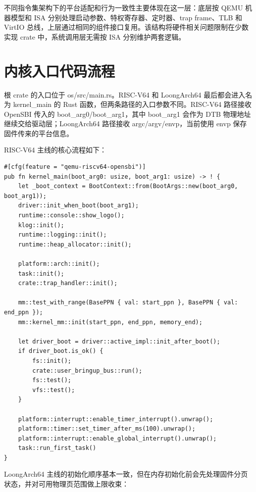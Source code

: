\documentclass[12pt,openany,oneside,AutoFakeBold=true]{ctexbook}
\newcommand{\code}[1]{\textnormal{\rmfamily #1}}
\begin{document}
不同指令集架构下的平台适配和行为一致性主要体现在这一层：底层按 QEMU 机器模型和 ISA 分别处理启动参数、特权寄存器、定时器、trap frame、TLB 和 VirtIO 总线，上层通过相同的组件接口复用。该结构将硬件相关问题限制在少数实现 crate 中，系统调用层无需按 ISA 分别维护两套逻辑。


\section{内核入口代码流程}

根 crate 的入口位于 \code{os/src/main.rs}。RISC-V64 和 LoongArch64 最后都会进入名为 \code{kernel\_main} 的 Rust 函数，但两条路径的入口参数不同。RISC-V64 路径接收 OpenSBI 传入的 \code{boot\_arg0/boot\_arg1}，其中 \code{boot\_arg1} 会作为 DTB 物理地址继续交给驱动层；LoongArch64 路径接收 \code{argc/argv/envp}，当前使用 \code{envp} 保存固件传来的平台信息。

RISC-V64 主线的核心流程如下：

\begin{lstlisting}
#[cfg(feature = "qemu-riscv64-opensbi")]
pub fn kernel_main(boot_arg0: usize, boot_arg1: usize) -> ! {
    let _boot_context = BootContext::from(BootArgs::new(boot_arg0, boot_arg1));
    driver::init_when_boot(boot_arg1);
    runtime::console::show_logo();
    klog::init();
    runtime::logging::init();
    runtime::heap_allocator::init();

    platform::arch::init();
    task::init();
    crate::trap_handler::init();

    mm::test_with_range(BasePPN { val: start_ppn }, BasePPN { val: end_ppn });
    mm::kernel_mm::init(start_ppn, end_ppn, memory_end);

    let driver_boot = driver::active_impl::init_after_boot();
    if driver_boot.is_ok() {
        fs::init();
        crate::user_bringup_bus::run();
        fs::test();
        vfs::test();
    }

    platform::interrupt::enable_timer_interrupt().unwrap();
    platform::timer::set_timer_after_ms(100).unwrap();
    platform::interrupt::enable_global_interrupt().unwrap();
    task::run_first_task()
}
\end{lstlisting}

LoongArch64 主线的初始化顺序基本一致，但在内存初始化前会先处理固件分页状态，并对可用物理页范围做上限收束：
\end{document}

